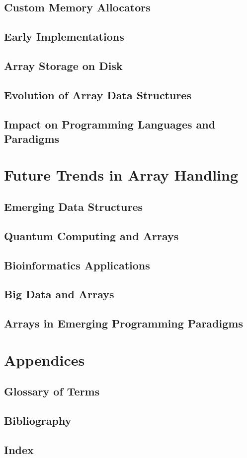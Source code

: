 \documentclass[12pt, oneside]{book}
\begin{document}
\section{Custom Memory Allocators}\section{Early Implementations}
\section{Array Storage on Disk}\section{Evolution of Array Data Structures}
\section{Impact on Programming Languages and Paradigms}

\chapter{Future Trends in Array Handling}
\section{Emerging Data Structures}
\section{Quantum Computing and Arrays}
\section{Bioinformatics Applications}
\section{Big Data and Arrays}
\section{Arrays in Emerging Programming Paradigms}
\chapter{Appendices}
\section{Glossary of Terms}
\section{Bibliography}
\section{Index}
\end{document}
